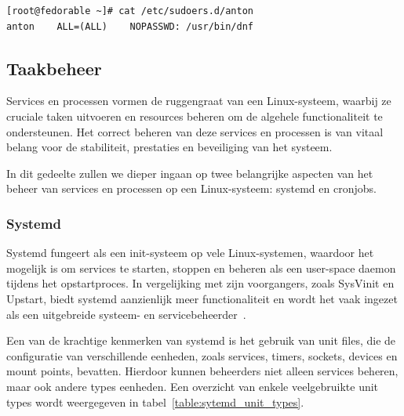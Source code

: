 \begin{listing}
  \begin{verbatim}
[root@fedorable ~]# cat /etc/sudoers.d/anton
anton    ALL=(ALL)    NOPASSWD: /usr/bin/dnf
  \end{verbatim}
  \caption{Uitvoer van het \texttt{cat}-commando dat de inhoud van het bestand \texttt{/etc/sudoers.d/anton} laat zien. Hieruit blijkt dat de gebruiker \texttt{anton} root-privileges heeft voor het uitvoeren van het \texttt{dnf}-commando en geen wachtwoord hoeft in te voeren bij dit commando.}
  \label{lst:linux-sudoers}
\end{listing}

\subsection{Taakbeheer}
\label{linux_taakbeheer}

Services en processen vormen de ruggengraat van een Linux-systeem, waarbij ze cruciale taken uitvoeren en resources beheren om de algehele functionaliteit te ondersteunen.
Het correct beheren van deze services en processen is van vitaal belang voor de stabiliteit, prestaties en beveiliging van het systeem.

In dit gedeelte zullen we dieper ingaan op twee belangrijke aspecten van het beheer van services en processen op een Linux-systeem: systemd en cronjobs.

\subsubsection{Systemd}
\label{linux_systemd}

Systemd fungeert als een init-systeem op vele Linux-systemen, waardoor het mogelijk is om services te starten, stoppen en beheren als een user-space daemon tijdens het opstartproces.
In vergelijking met zijn voorgangers, zoals SysVinit en Upstart, biedt systemd aanzienlijk meer functionaliteit en wordt het vaak ingezet als een uitgebreide systeem- en servicebeheerder~\autocite{ward2021linux}.

Een van de krachtige kenmerken van systemd is het gebruik van unit files, die de configuratie van verschillende eenheden, zoals services, timers, sockets, devices en mount points, bevatten.
Hierdoor kunnen beheerders niet alleen services beheren, maar ook andere types eenheden.
Een overzicht van enkele veelgebruikte unit types wordt weergegeven in tabel~\ref{table:sytemd_unit_types}.

